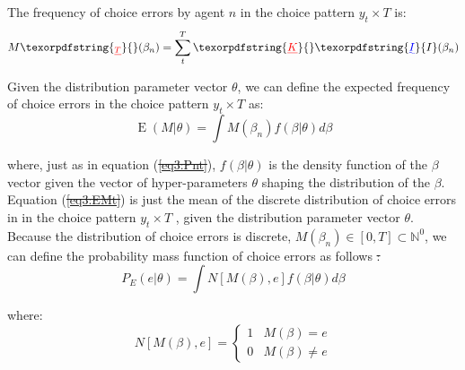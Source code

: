 \documentclass[11pt,a4paper]{article} %
\newcommand{\E}{\operatorname{E}}			%
\providecommand{\DIFaddtex}[1]{{\protect\color{blue}\uwave{#1}}} %
\providecommand{\DIFdeltex}[1]{{\protect\color{red}\sout{#1}}}                      %
\providecommand{\DIFaddbegin}{} %
\providecommand{\DIFaddend}{} %
\providecommand{\DIFdelbegin}{} %
\providecommand{\DIFdelend}{} %
\providecommand{\DIFadd}[1]{\texorpdfstring{\DIFaddtex{#1}}{#1}} %
\providecommand{\DIFdel}[1]{\texorpdfstring{\DIFdeltex{#1}}{}} %
\newcommand{\DIFscaledelfig}{0.5}
\newlength{\DIFdelgraphicswidth} %
\newlength{\DIFdelgraphicsheight} %
\newcommand{\DIFaddincludegraphics}[2][]{{\color{blue}\fbox{\DIFOincludegraphics[#1]{#2}}}} %
\newcommand{\DIFdelincludegraphics}[2][]{%
\sbox{\DIFdelgraphicsbox}{\DIFOincludegraphics[#1]{#2}}%
\settoboxwidth{\DIFdelgraphicswidth}{\DIFdelgraphicsbox} %
\settoboxtotalheight{\DIFdelgraphicsheight}{\DIFdelgraphicsbox} %
\scalebox{\DIFscaledelfig}{%
\parbox[b]{\DIFdelgraphicswidth}{\usebox{\DIFdelgraphicsbox}\\[-\baselineskip] \rule{\DIFdelgraphicswidth}{0em}}\llap{\resizebox{\DIFdelgraphicswidth}{\DIFdelgraphicsheight}{%
\setlength{\unitlength}{\DIFdelgraphicswidth}%
\begin{picture}(1,1)%
\thicklines\linethickness{2pt} %
{\color[rgb]{1,0,0}\put(0,0){\framebox(1,1){}}}%
{\color[rgb]{1,0,0}\put(0,0){\line( 1,1){1}}}%
{\color[rgb]{1,0,0}\put(0,1){\line(1,-1){1}}}%
\end{picture}%
}\hspace*{3pt}}} %
} %
\DeclareRobustCommand{\DIFaddbegin}{\DIFOaddbegin \let\includegraphics\DIFaddincludegraphics} %
\DeclareRobustCommand{\DIFaddend}{\DIFOaddend \let\includegraphics\DIFOincludegraphics} %
\DeclareRobustCommand{\DIFdelbegin}{\DIFOdelbegin \let\includegraphics\DIFdelincludegraphics} %
\DeclareRobustCommand{\DIFdelend}{\DIFOaddend \let\includegraphics\DIFOincludegraphics} %
\begin{document}
\noindent The frequency of choice errors by agent $n$ in the choice pattern $y_t \times T$ is:
\begin{equation}
	\DIFdelbegin %
\DIFdelend \DIFaddbegin \label{eq:MBn}
	\DIFaddend M\DIFdelbegin \DIFdel{_T}\DIFdelend (\beta_n) = \sum_t^T \DIFdelbegin \DIFdel{K}\DIFdelend \DIFaddbegin \DIFadd{I}\DIFaddend (\beta_n)
\end{equation}

Given the distribution parameter vector $\theta$, we can define the expected frequency of choice errors in the choice pattern $y_t \times T$ as:
\begin{equation}
	\DIFdelbegin %
\DIFdelend \DIFaddbegin \label{eq:EMt}
	\DIFaddend \E(M | \theta) = \int M(\beta_n) f(\beta | \theta) d\beta
\end{equation}

\noindent where, just as in equation (\DIFdelbegin \DIFdel{\ref{eq3:Pnt}}\DIFdelend \DIFaddbegin \DIFadd{\ref{eq:Pnt}}\DIFaddend ), $f(\beta|\theta)$ is the density function of the $\beta$ vector given the vector of hyper-parameters $\theta$ shaping the distribution of the $\beta$.
Equation (\DIFdelbegin \DIFdel{\ref{eq3:EMt}}\DIFdelend \DIFaddbegin \DIFadd{\ref{eq:EMt}}\DIFaddend ) is just the mean of the discrete distribution of choice errors in in the choice pattern $y_t \times T$ , given the distribution parameter vector $\theta$.
Because the distribution of choice errors is discrete, $M(\beta_n) \in [0,T] \subset \mathbb{N}^0$,\DIFaddbegin {\footnotemark} \DIFaddend we can define the probability mass function of choice errors as follows\DIFdelbegin %
\DIFdel{:
}\DIFdelend \DIFaddbegin \DIFadd{:
}\DIFaddend \begin{equation}
	\DIFdelbegin %
\DIFdelend \DIFaddbegin \label{eq:PE}
	\DIFaddend P_E(e | \theta) = \int N[M(\beta),e] f(\beta|\theta) d \beta
\end{equation}

\addtocounter{footnote}{-1}

\noindent where:
\begin{equation}
	\DIFdelbegin %
\DIFdelend \DIFaddbegin \label{eq:NMB}
	\DIFaddend N[M(\beta), e] = 
	\begin{cases}
		1 & M(\beta) = e\\
		0 & M(\beta) \neq e
	\end{cases}
\end{equation}
\end{document}
